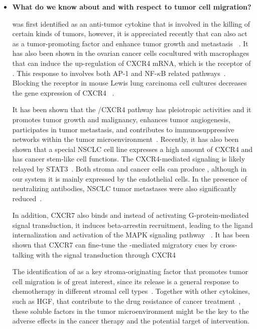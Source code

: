 \begin{itemize}
\item \textbf{What do we know about \tnfa and \sdfonea with respect to tumor cell migration?}

\tnfa was first identified as an anti-tumor cytokine that is involved in the killing
of certain kinds of tumors, however, it is appreciated recently that \tnfa can also 
act as a tumor-promoting factor and enhance tumor growth and metastasis%
~\citep{Wu2010}. It has also been shown in the ovarian cancer cells cocultured with
macrophages that \tnfa can induce the up-regulation of 
CXCR4 mRNA, which is the receptor of \sdfonea. This response to \tnfa involves both
AP-1 and NF-$\kappa$B related pathways~\citep{Kulbe2005}. Blocking the \tnfa receptor
in mouse Lewis lung carcinoma cell cultures decreases the gene expression of CXCR4~%
\citep{Sasi2011}.

It has been shown that the \sdfonea/CXCR4 pathway has pleiotropic activities and it 
promotes tumor growth and malignancy, enhances tumor angiogenesis, participates in tumor metastasis, and contributes to immunosuppressive networks within the tumor microenvironment~\citep{Kryczek2007}. 
Recently, it has also been shown that a special NSCLC cell line expresses a
high amount of CXCR4 and has cancer stem-like cell functions. The CXCR4-mediated
signaling is likely relayed by STAT3~\citep{Jung2013}.
Both stroma and cancer cells can produce \sdfonea, 
although in our system it is mainly expressed by the endothelial cells. In the presence of neutralizing \sdfonea antibodies, NSCLC tumor metastases were also significantly reduced~\citep{Phillips2003}.

In addition, CXCR7 also binds \sdfonea and instead of 
activating G-protein-mediated signal transduction, it induces 
beta-arrestin
recruitment, leading to the ligand internalization and 
activation of the MAPK signaling pathway%
~\citep{Rajagopal2010a}. It has been shown that CXCR7 can
fine-tune the \sdfonea-mediated migratory cues by cross-talking
with the signal transduction through CXCR4%
~\citep{Zabel2009,Liberman2012f}

The identification of \tnfa as a key stroma-originating factor that promotes 
tumor cell migration is of great interest, since its release is a general response to chemotherapy in different stromal cell types~\citep{Acharyya2012}. Together with
other cytokines, such as HGF, that contribute to the drug resistance of cancer
treatment~\citep{Straussman2012}, these soluble factors in the tumor microenvironment
might be the key to the adverse effects in the cancer therapy and the potential target of intervention.



\end{itemize}
